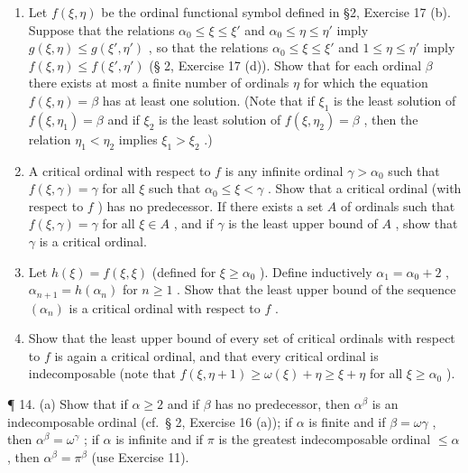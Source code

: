 \begin{enumerate}
\def\labelenumi{(\alph{enumi})}
\setcounter{enumi}{1}
\item
  Let \(f(\xi, \eta)\) be the ordinal functional symbol defined in §2, Exercise 17 (b). Suppose that the relations \(\alpha_0 \leqslant \xi \leqslant \xi'\) and \(\alpha_0 \leqslant \eta \leqslant \eta'\) imply \(g(\xi, \eta) \leqslant g(\xi', \eta')\) , so that the relations \(\alpha_0 \leqslant \xi \leqslant \xi'\) and \(1 \leqslant \eta \leqslant \eta'\) imply \(f(\xi, \eta) \leqslant f(\xi', \eta')\) (§ 2, Exercise 17 (d)). Show that for each ordinal \(\beta\) there exists at most a finite number of ordinals \(\eta\) for which the equation \(f(\xi, \eta) = \beta\) has at least one solution. (Note that if \(\xi_1\) is the least solution of \(f(\xi, \eta_1) = \beta\) and if \(\xi_2\) is the least solution of \(f(\xi, \eta_2) = \beta\) , then the relation \(\eta_1 < \eta_2\) implies \(\xi_1 > \xi_2\) .)
\item
  A critical ordinal with respect to \(f\) is any infinite ordinal \(\gamma > \alpha_0\) such that \(f(\xi, \gamma) = \gamma\) for all \(\xi\) such that \(\alpha_0 \leqslant \xi < \gamma\) . Show that a critical ordinal (with respect to \(f\) ) has no predecessor. If there exists a set \(A\) of ordinals such that \(f(\xi, \gamma) = \gamma\) for all \(\xi \in A\) , and if \(\gamma\) is the least upper bound of \(A\) , show that \(\gamma\) is a critical ordinal.
\item
  Let \(h(\xi) = f(\xi, \xi)\) (defined for \(\xi \geqslant \alpha_0\) ). Define inductively \(\alpha_1 = \alpha_0 + 2\) , \(\alpha_{n+1} = h(\alpha_n)\) for \(n \geqslant 1\) . Show that the least upper bound of the sequence \((\alpha_n)\) is a critical ordinal with respect to \(f\) .
\item
  Show that the least upper bound of every set of critical ordinals with respect to \(f\) is again a critical ordinal, and that every critical ordinal is indecomposable (note that \(f(\xi, \eta + 1) \geqslant \omega(\xi) + \eta \geqslant \xi + \eta\) for all \(\xi \geqslant \alpha_0\) ).
\end{enumerate}

¶ 14. (a) Show that if \(\alpha \geqslant 2\) and if \(\beta\) has no predecessor, then \(\alpha^{\beta}\) is an indecomposable ordinal (cf.~§ 2, Exercise 16 (a)); if \(\alpha\) is finite and if \(\beta = \omega \gamma\) , then \(\alpha^{\beta} = \omega^{\gamma}\) ; if \(\alpha\) is infinite and if \(\pi\) is the greatest indecomposable ordinal \(\leqslant \alpha\) , then \(\alpha^{\beta} = \pi^{\beta}\) (use Exercise 11).

